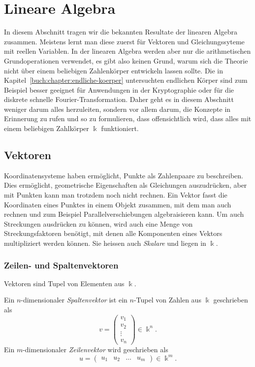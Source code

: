 %
%
%
\section{Lineare Algebra
\label{buch:grundlagen:section:linearealgebra}}
In diesem Abschnitt tragen wir die bekannten Resultate der linearen
Algebra zusammen.
Meistens lernt man diese zuerst für Vektoren und Gleichungssyteme mit
reellen Variablen.
In der linearen Algebra werden aber nur die arithmetischen
Grundoperationen verwendet, es gibt also keinen Grund, warum sich
die Theorie nicht über einem beliebigen Zahlenkörper entwickeln
lassen sollte.
Die in Kapitel~\ref{buch:chapter:endliche-koerper} untersuchten
endlichen Körper sind zum Beispiel besser geeignet für Anwendungen in
der Kryptographie oder für die diskrete schnelle Fourier-Transformation.
Daher geht es in diesem Abschnitt weniger darum alles herzuleiten,
sondern vor allem darum, die Konzepte in Erinnerung zu rufen und
so zu formulieren, dass offensichtlich wird, dass alles mit einem
beliebigen Zahlkörper $\Bbbk$ funktioniert.

%
%
\subsection{Vektoren
\label{buch:grundlagen:subsection:vektoren}}
Koordinatensysteme haben ermöglicht, Punkte als Zahlenpaare zu beschreiben.
Dies ermöglicht, geometrische Eigenschaften als Gleichungen auszudrücken,
aber mit Punkten kann man trotzdem noch nicht rechnen.
Ein Vektor fasst die Koordinaten eines Punktes in einem Objekt zusammen,
mit dem man auch rechnen und zum Beispiel Parallelverschiebungen
algebraisieren kann.
Um auch Streckungen ausdrücken zu können, wird auch eine Menge von 
Streckungsfaktoren benötigt, mit denen alle Komponenten eines Vektors
multipliziert werden können.
Sie heissen auch {\em Skalare} und liegen in $\Bbbk$.

\subsubsection{Zeilen- und Spaltenvektoren}
Vektoren sind Tupel von Elementen aus $\Bbbk$.

\begin{definition}
Ein $n$-dimensionaler {\em Spaltenvektor} ist ein $n$-Tupel von Zahlen aus
$\Bbbk$ geschrieben als
\[
v = \begin{pmatrix} v_1\\v_2\\\vdots\\v_n\end{pmatrix}
\in \Bbbk^n.
\]
Ein $m$-dimensionaler {\em Zeilenvektor} wird geschrieben als
\[
u = \begin{pmatrix}u_1&u_2&\dots&u_m\end{pmatrix} \in \Bbbk^m.
\]
\end{definition}

